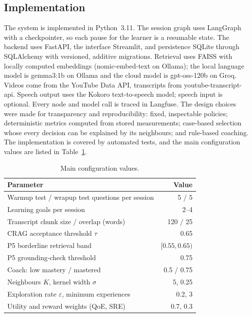 \subsection{Implementation}

The system is implemented in Python~3.11. The session graph uses LangGraph with a checkpointer, so each pause for the
learner is a resumable state. The backend uses FastAPI, the interface Streamlit, and persistence SQLite through
SQLAlchemy with versioned, additive migrations. Retrieval uses FAISS with locally computed embeddings
(nomic-embed-text on Ollama); the local language model is gemma3:1b on Ollama and the cloud model is gpt-oss-120b on
Groq. Videos come from the YouTube Data API, transcripts from youtube-transcript-api. Speech output uses the Kokoro
text-to-speech model; speech input is optional. Every node and model call is traced in Langfuse. The design choices
were made for transparency and reproducibility: fixed, inspectable policies; deterministic metrics computed from
stored measurements; case-based selection whose every decision can be explained by its neighbours; and rule-based
coaching. The implementation is covered by automated tests, and the main configuration values are listed in
Table~\ref{tab:config}.

\begin{table}[htbp]
\centering
\caption{Main configuration values.}
\label{tab:config}
\begin{tabular}{lr}
\toprule
Parameter & Value \\
\midrule
Warmup test / wrapup test questions per session & 5 / 5 \\
Learning goals per session & 2--4 \\
Transcript chunk size / overlap (words) & 120 / 25 \\
CRAG acceptance threshold $\tau$ & 0.65 \\
P5 borderline retrieval band & $[0.55, 0.65)$ \\
P5 grounding-check threshold & 0.75 \\
Coach: low mastery / mastered & 0.5 / 0.75 \\
Neighbours $K$, kernel width $\sigma$ & 5, 0.25 \\
Exploration rate $\varepsilon$, minimum experiences & 0.2, 3 \\
Utility and reward weights (QoE, SRE) & 0.7, 0.3 \\
\bottomrule
\end{tabular}
\end{table}
